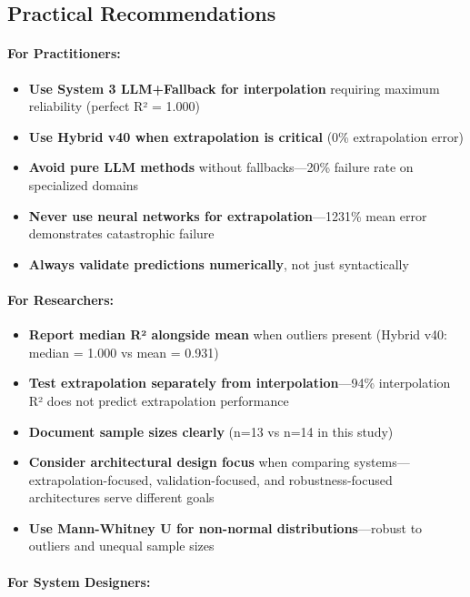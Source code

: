 \subsection{Practical Recommendations}
\label{sec:practical_recommendations}

\paragraph{For Practitioners:}

\begin{itemize}
    \item \textbf{Use System 3 LLM+Fallback for interpolation} requiring maximum reliability (perfect R² = 1.000)
    \item \textbf{Use Hybrid v40 when extrapolation is critical} (0\% extrapolation error)
    \item \textbf{Avoid pure LLM methods} without fallbacks—20\% failure rate on specialized domains
    \item \textbf{Never use neural networks for extrapolation}—1231\% mean error demonstrates catastrophic failure
    \item \textbf{Always validate predictions numerically}, not just syntactically
\end{itemize}

\paragraph{For Researchers:}

\begin{itemize}
    \item \textbf{Report median R² alongside mean} when outliers present (Hybrid v40: median = 1.000 vs mean = 0.931)
    \item \textbf{Test extrapolation separately from interpolation}—94\% interpolation R² does not predict extrapolation performance
    \item \textbf{Document sample sizes clearly} (n=13 vs n=14 in this study)
    \item \textbf{Consider architectural design focus} when comparing systems—extrapolation-focused, validation-focused, and robustness-focused architectures serve different goals
    \item \textbf{Use Mann-Whitney U for non-normal distributions}—robust to outliers and unequal sample sizes
\end{itemize}

\paragraph{For System Designers:}

